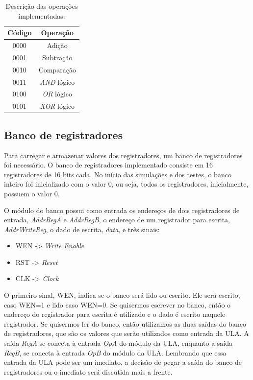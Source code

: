 \documentclass[11pt,a4paper,titlepage]{article}
\begin{document}
\begin{table}[h]
\centering
\begin{tabular}{| c | c |}
\hline
Código  & Operação \\
\hline
0000 & Adição\\
\hline
0001 & Subtração\\
\hline
0010 & Comparação\\
\hline
0011 & \textit{AND} lógico\\
\hline
0100 & \textit{OR} lógico\\
\hline
0101 & \textit{XOR} lógico\\
\hline
\end{tabular}
\caption{Descrição das operações implementadas.}
\label{tab:imp}
\end{table}
%

\subsection{Banco de registradores}\label{subsec:imp-br}

Para carregar e armazenar valores dos registradores, um banco de registradores foi necessário.
O banco de registradores implementado consiste em 16 registradores de 16 bits cada.
No início das simulações e dos testes, o banco inteiro foi inicializado com o valor 0, ou seja, todos os registradores, inicialmente, possuem o valor 0.

O módulo do banco possui como entrada os endereços de dois registradores de entrada, \textit{AddrRegA} e \textit{AddrRegB}, o endereço de um registrador para escrita, \textit{AddrWriteReg}, o dado de escrita, \textit{data}, e três sinais:

\begin{itemize}
\item WEN -> \textit{Write Enable}
\item RST -> \textit{Reset}
\item CLK -> \textit{Clock} 
\end{itemize}

O primeiro sinal, WEN, indica se o banco será lido ou escrito.
Ele será escrito, caso WEN=1 e lido caso WEN=0.
Se quisermos escrever no banco, então o endereço do registrador para escrita é utilizado e o dado é escrito naquele registrador.
Se quisermos ler do banco, então utilizamos as duas saídas do banco de registradores, que são os valores que serão utilizados como entrada da ULA.
A saída \textit{RegA} se conecta à entrada \textit{OpA} do módulo da ULA, enquanto a saída \textit{RegB}, se conecta à entrada \textit{OpB} do módulo da ULA.
Lembrando que essa entrada da ULA pode ser um imediato, a decisão de pegar a saída do banco de registradores ou o imediato será discutida mais a frente.
\end{document}
